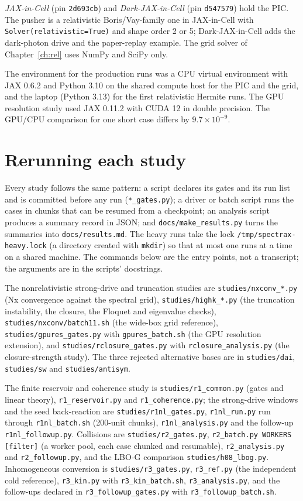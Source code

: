 \emph{JAX-in-Cell} (pin \texttt{2d693cb}) and \emph{Dark-JAX-in-Cell} (pin \texttt{d547579}) hold the PIC. The pusher is a relativistic Boris/Vay-family one in JAX-in-Cell with \texttt{Solver(relativistic=True)} and shape order 2 or 5; Dark-JAX-in-Cell adds the dark-photon drive and the paper-replay example. The grid solver of Chapter~\ref{ch:rel} uses NumPy and SciPy only.

The environment for the production runs was a CPU virtual environment with JAX 0.6.2 and Python 3.10 on the shared compute host for the PIC and the grid, and the laptop (Python 3.13) for the first relativistic Hermite runs. The GPU resolution study used JAX 0.11.2 with CUDA 12 in double precision. The GPU/CPU comparison for one short case differs by $9.7\times10^{-9}$.

\section{Rerunning each study}

Every study follows the same pattern: a script declares its gates and its run list and is committed before any run (\texttt{*\_gates.py}); a driver or batch script runs the cases in chunks that can be resumed from a checkpoint; an analysis script produces a summary record in JSON; and \texttt{docs/make\_results.py} turns the summaries into \texttt{docs/results.md}. The heavy runs take the lock \texttt{/tmp/spectrax-heavy.lock} (a directory created with \texttt{mkdir}) so that at most one runs at a time on a shared machine. The commands below are the entry points, not a transcript; the arguments are in the scripts' docstrings.

The nonrelativistic strong-drive and truncation studies are \texttt{studies/nxconv\_*.py} (Nx convergence against the spectral grid), \texttt{studies/highk\_*.py} (the truncation instability, the closure, the Floquet and eigenvalue checks), \texttt{studies/nxconv/batch11.sh} (the wide-box grid reference), \texttt{studies/gpures\_gates.py} with \texttt{gpures\_batch.sh} (the GPU resolution extension), and \texttt{studies/rclosure\_gates.py} with \texttt{rclosure\_analysis.py} (the closure-strength study). The three rejected alternative bases are in \texttt{studies/dai}, \texttt{studies/sw} and \texttt{studies/antisym}.

The finite reservoir and coherence study is \texttt{studies/r1\_common.py} (gates and linear theory), \texttt{r1\_reservoir.py} and \texttt{r1\_coherence.py}; the strong-drive windows and the seed back-reaction are \texttt{studies/r1nl\_gates.py}, \texttt{r1nl\_run.py} run through \texttt{r1nl\_batch.sh} (200-unit chunks), \texttt{r1nl\_analysis.py} and the follow-up \texttt{r1nl\_followup.py}. Collisions are \texttt{studies/r2\_gates.py}, \texttt{r2\_batch.py WORKERS [filter]} (a worker pool, each case chunked and resumable), \texttt{r2\_analysis.py} and \texttt{r2\_followup.py}, and the LBO-G comparison \texttt{studies/h08\_lbog.py}. Inhomogeneous conversion is \texttt{studies/r3\_gates.py}, \texttt{r3\_ref.py} (the independent cold reference), \texttt{r3\_kin.py} with \texttt{r3\_kin\_batch.sh}, \texttt{r3\_analysis.py}, and the follow-ups declared in \texttt{r3\_followup\_gates.py} with \texttt{r3\_followup\_batch.sh}.

